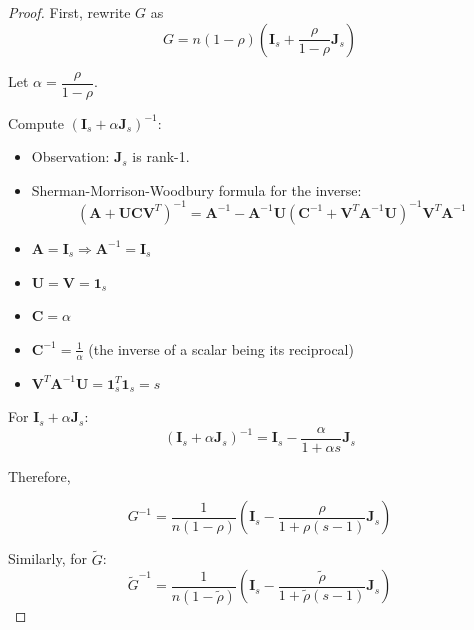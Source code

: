 \begin{proof}

First, rewrite $ G $ as
\begin{equation}\label{eq:app-lemma4-scaled-raw-gram}
G = n (1 - \rho) \left( \mathbf{I}_s + \frac{\rho}{1 - \rho} \mathbf{J}_s \right)
\end{equation}

Let $ \alpha = \dfrac{\rho}{1 - \rho} $.

Compute $ ( \mathbf{I}_s + \alpha \mathbf{J}_s )^{-1} $:

\begin{itemize}
	\item Observation: $ \mathbf{J}_s $ is rank-1.
	\item Sherman-Morrison-Woodbury formula for the inverse:
	\begin{equation}\label{eq:app-lemma4-sherman-morrison-woodbury}
	(\mathbf{A} + \mathbf{U}\mathbf{C}\mathbf{V}^T)^{-1} = \mathbf{A}^{-1} - \mathbf{A}^{-1}\mathbf{U}(\mathbf{C}^{-1} + \mathbf{V}^T\mathbf{A}^{-1}\mathbf{U})^{-1}\mathbf{V}^T\mathbf{A}^{-1}
	\end{equation}
	\setlength\itemsep{-0.25em} %
	\item $\mathbf{A} = \mathbf{I}_s \Rightarrow \mathbf{A}^{-1} = \mathbf{I}_s$
	\item $\mathbf{U} = \mathbf{V} = \mathbf{1}_s$
	\item $\mathbf{C} = \alpha$
	\item $\mathbf{C}^{-1} = \frac{1}{\alpha}$ (the inverse of a scalar being its reciprocal)
	\item $\mathbf{V}^T \mathbf{A}^{-1} \mathbf{U} = \mathbf{1}_s^T \mathbf{1}_s = s$
\end{itemize}

For $\mathbf{I}_s + \alpha \mathbf{J}_s$:
\begin{equation}\label{eq:app-lemma4-rank-one-inverse}
(\mathbf{I}_s + \alpha \mathbf{J}_s)^{-1} = \mathbf{I}_s - \frac{\alpha}{1 + \alpha s}\mathbf{J}_s
\end{equation}

Therefore,

\begin{equation}\label{eq:app-lemma4-raw-gram-inverse}
G^{-1} = \frac{1}{n (1 - \rho)} \left( \mathbf{I}_s - \frac{\rho}{1 + \rho (s - 1)} \mathbf{J}_s \right)
\end{equation}

Similarly, for $\tilde{G}$:
\begin{equation}\label{eq:app-lemma4-binarized-gram-inverse}
\tilde{G}^{-1} = \frac{1}{n (1 - \tilde{\rho})} \left( \mathbf{I}_s - \frac{\tilde{\rho}}{1 + \tilde{\rho} (s - 1)} \mathbf{J}_s \right)
\end{equation}


\end{proof}
